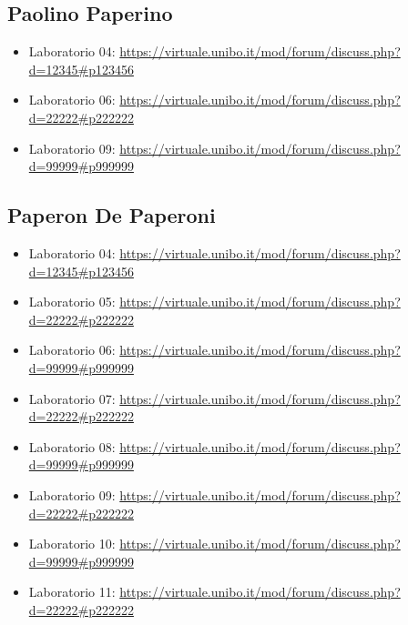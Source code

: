 \documentclass[a4paper,12pt]{report}
\begin{document}
\subsection{Paolino Paperino}

\begin{itemize}
 \item Laboratorio 04: \url{https://virtuale.unibo.it/mod/forum/discuss.php?d=12345#p123456}
 \item Laboratorio 06: \url{https://virtuale.unibo.it/mod/forum/discuss.php?d=22222#p222222}
 \item Laboratorio 09: \url{https://virtuale.unibo.it/mod/forum/discuss.php?d=99999#p999999}
\end{itemize}

\subsection{Paperon De Paperoni}

\begin{itemize}
 \item Laboratorio 04: \url{https://virtuale.unibo.it/mod/forum/discuss.php?d=12345#p123456}
 \item Laboratorio 05: \url{https://virtuale.unibo.it/mod/forum/discuss.php?d=22222#p222222}
 \item Laboratorio 06: \url{https://virtuale.unibo.it/mod/forum/discuss.php?d=99999#p999999}
 \item Laboratorio 07: \url{https://virtuale.unibo.it/mod/forum/discuss.php?d=22222#p222222}
 \item Laboratorio 08: \url{https://virtuale.unibo.it/mod/forum/discuss.php?d=99999#p999999}
 \item Laboratorio 09: \url{https://virtuale.unibo.it/mod/forum/discuss.php?d=22222#p222222}
 \item Laboratorio 10: \url{https://virtuale.unibo.it/mod/forum/discuss.php?d=99999#p999999}
 \item Laboratorio 11: \url{https://virtuale.unibo.it/mod/forum/discuss.php?d=22222#p222222}
\end{itemize}




\end{document}
